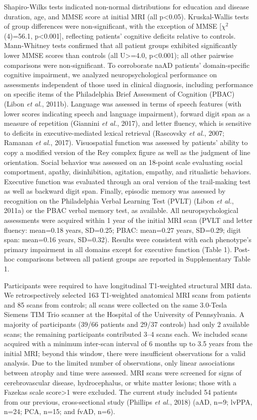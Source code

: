 \documentclass[]{article}
\begin{document}
Shapiro-Wilks tests indicated non-normal distributions for education and
disease duration, age, and MMSE score at initial MRI (all
p\textless{}0.05). Kruskal-Wallis tests of group differences were
non-significant, with the exception of MMSE {[}\(\chi^2\)(4)=56.1,
p\textless{}0.001{]}, reflecting patients' cognitive deficits relative
to controls. Mann-Whitney tests confirmed that all patient groups
exhibited significantly lower MMSE scores than controls (all
U\textgreater{}=4.0, p\textless{}0.001); all other pairwise comparisons
were non-significant. To corroborate naAD patients' domain-specific
cognitive impairment, we analyzed neuropsychological performance on
assessments independent of those used in clinical diagnosis, including
performance on specific items of the Philadelphia Brief Assessment of
Cognition (PBAC) (Libon \emph{et al.}, 2011b). Language was assessed in
terms of speech features (with lower scores indicating speech and
language impairment), forward digit span as a measure of repetition
(Giannini \emph{et al.}, 2017), and letter fluency, which is sensitive
to deficits in executive-mediated lexical retrieval (Rascovsky \emph{et
al.}, 2007; Ramanan \emph{et al.}, 2017). Visuospatial function was
assessed by patients' ability to copy a modified version of the Rey
complex figure as well as the judgment of line orientation. Social
behavior was assessed on an 18-point scale evaluating social
comportment, apathy, disinhibition, agitation, empathy, and ritualistic
behaviors. Executive function was evaluated through an oral version of
the trail-making test as well as backward digit span. Finally, episodic
memory was assessed by recognition on the Philadelphia Verbal Learning
Test (PVLT) (Libon \emph{et al.}, 2011a) or the PBAC verbal memory test,
as available. All neuropsychological assessments were acquired within 1
year of the initial MRI scan (PVLT and letter fluency: mean=0.18 years,
SD=0.25; PBAC: mean=0.27 years, SD=0.29; digit span: mean=0.16 years,
SD=0.32). Results were consistent with each phenotype's primary
impairment in all domains except for executive function (Table 1).
Post-hoc comparisons between all patient groups are reported in
Supplementary Table 1.

Participants were required to have longitudinal T1-weighted structural
MRI data. We retrospectively selected 163 T1-weighted anatomical MRI
scans from patients and 85 scans from controls; all scans were collected
on the same 3.0-Tesla Siemens TIM Trio scanner at the Hospital of the
University of Pennsylvania. A majority of participants (39/66 patients
and 29/37 controls) had only 2 available scans; the remaining
participants contributed 3--4 scans each. We included scans acquired
with a minimum inter-scan interval of 6 months up to 3.5 years from the
initial MRI; beyond this window, there were insufficient observations
for a valid analysis. Due to the limited number of observations, only
linear associations between atrophy and time were assessed. MRI scans
were screened for signs of cerebrovascular disease, hydrocephalus, or
white matter lesions; those with a Fazekas scale score\textgreater{}1
were excluded. The current study included 54 patients from our previous,
cross-sectional study (Phillips \emph{et al.}, 2018) (aAD, n=9; lvPPA,
n=24; PCA, n=15; and fvAD, n=6).
\end{document}
